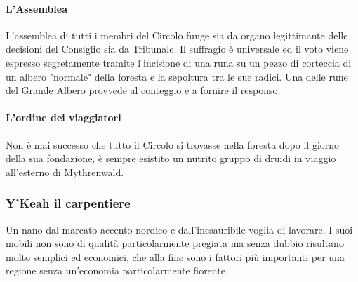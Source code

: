 \paragraph{L'Assemblea} L'assemblea di tutti i membri del Circolo funge sia da organo legittimante delle decisioni del Consiglio sia da Tribunale. Il suffragio è universale ed il voto viene espresso segretamente tramite l'incisione di una runa su un pezzo di corteccia di un albero "normale" della foresta e la sepoltura tra le sue radici. Una delle rune del Grande Albero provvede al conteggio e a fornire il responso.

\paragraph{L'ordine dei viaggiatori} Non è mai successo che tutto il Circolo si trovasse nella foresta dopo il giorno della sua fondazione, è sempre esistito un nutrito gruppo di druidi in viaggio all'esterno di Mythrenwald.

\subsubsection{Y'Keah il carpentiere}

Un nano dal marcato accento nordico e dall'inesauribile voglia di lavorare. I suoi mobili non sono di qualità particolarmente pregiata ma senza dubbio risultano molto semplici ed economici, che alla fine sono i fattori più importanti per una regione senza un'economia particolarmente fiorente.